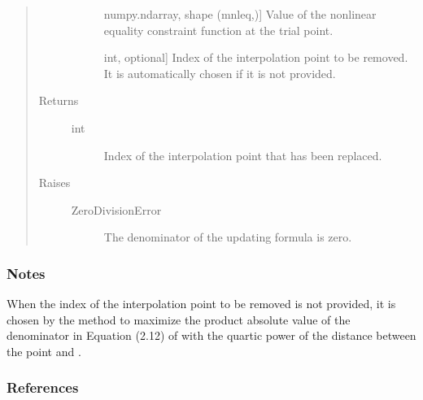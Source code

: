 \documentclass[letterpaper,10pt,english]{sphinxmanual}
\begin{document}
\begin{fulllineitems}
\begin{fulllineitems}
\begin{quote}
\begin{description}
\begin{description}
\item[{}] \leavevmode{[}numpy.ndarray, shape (mnleq,){]}
\sphinxAtStartPar
Value of the nonlinear equality constraint function at the trial
point.

\item[{}] \leavevmode{[}int, optional{]}
\sphinxAtStartPar
Index of the interpolation point to be removed. It is automatically
chosen if it is not provided.

\end{description}

\item[{Returns}] \leavevmode\begin{description}
\item[{int}] \leavevmode
\sphinxAtStartPar
Index of the interpolation point that has been replaced.

\end{description}

\item[{Raises}] \leavevmode\begin{description}
\item[{ZeroDivisionError}] \leavevmode
\sphinxAtStartPar
The denominator of the updating formula is zero.

\end{description}

\end{description}\end{quote}
\subsubsection*{Notes}

\sphinxAtStartPar
When the index  of the interpolation point to be removed is not
provided, it is chosen by the method to maximize the product absolute
value of the denominator in Equation (2.12) of  with the
quartic power of the distance between the point and .
\subsubsection*{References}

\sphinxAtStartPar
{}

\end{fulllineitems}


\end{fulllineitems}
\end{document}
